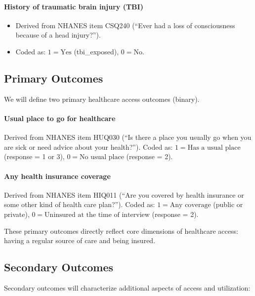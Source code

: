\documentclass{article}
\begin{document}
\paragraph{History of traumatic brain injury (TBI)}

\begin{itemize}
    \item Derived from NHANES item CSQ240 (``Ever had a loss of consciousness because of a head injury?'').

    \item Coded as: $1 = \text{Yes}$ (tbi\_exposed), $0 = \text{No}$.

\end{itemize}

\subsection{Primary Outcomes}

We will define two primary healthcare access outcomes (binary).

\paragraph{Usual place to go for healthcare}

Derived from NHANES item HUQ030 (``Is there a place you usually go when you are sick or need advice about your health?''). Coded as: $1 = \text{Has a usual place}$ (response = 1 or 3), $0 = \text{No usual place}$ (response = 2).

\paragraph{Any health insurance coverage}

Derived from NHANES item HIQ011 (``Are you covered by health insurance or some other kind of health care plan?''). Coded as: $1 = \text{Any coverage}$ (public or private), $0 = \text{Uninsured at the time of interview}$ (response = 2).

These primary outcomes directly reflect core dimensions of healthcare access: having a regular source of care and being insured.

\subsection{Secondary Outcomes}

Secondary outcomes will characterize additional aspects of access and utilization:
\end{document}

